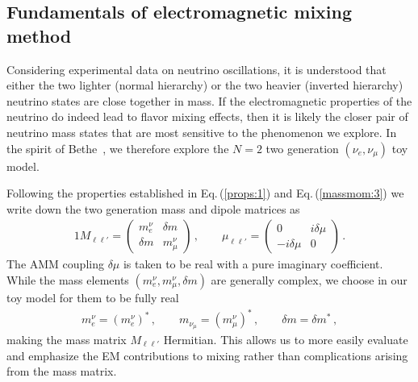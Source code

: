 \documentclass{ws-ijmpa}
\newcommand{\req}[1]{Eq.\,(\ref{#1})}
\begin{document}
\subsection{Fundamentals of electromagnetic mixing method}
Considering experimental data on neutrino oscillations, it is understood that either the two lighter (normal hierarchy) or the two heavier (inverted hierarchy) neutrino states are close together in mass. If the electromagnetic properties of the neutrino do indeed lead to flavor mixing effects, then it is likely the closer pair of neutrino mass states that are most sensitive to the phenomenon we explore. In the spirit of Bethe~\cite{Bethe:1986ej}, we therefore explore the $N=2$ two generation $(\nu_{e},\nu_{\mu})$ toy model.

Following the properties established in \req{props:1} and \req{massmom:3} we write down the two generation mass and dipole matrices as
\begin{alignat}{1}
\label{mix:1} M_{\ell\ell'}= 
\begin{pmatrix}
m_{e}^{\nu} & {\delta m}\\
{\delta m} & m_{\mu}^{\nu}
\end{pmatrix}\,,\qquad
\mu_{\ell\ell'} = 
\begin{pmatrix}
0 & i\delta\mu\\
-i\delta\mu & 0
\end{pmatrix}\,.
\end{alignat}
The AMM coupling $\delta\mu$ is taken to be real with a pure imaginary coefficient. While the mass elements $(m_{e}^{\nu},m_{\mu}^{\nu},{\delta m})$ are generally complex, we choose in our toy model for them to be fully real
\begin{align}
\label{choice:1}
m_{e}^{\nu}=(m_{e}^{\nu})^{*}\,,\qquad
m_{\nu_{\mu}}=(m_{\mu}^{\nu})^{*}\,,\qquad
\delta m=\delta m^{*}\,,
\end{align}
making the mass matrix $M_{\ell\ell'}$ Hermitian. This allows us to more easily evaluate and emphasize the EM contributions to mixing rather than complications arising from the mass matrix.
\end{document}
